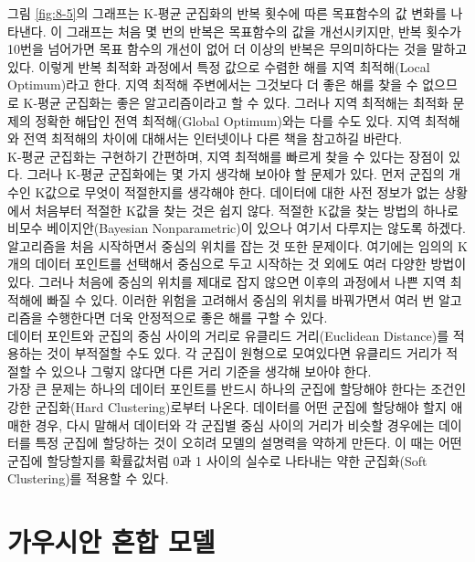 \documentclass[a4paper]{oblivoir}
\begin{document}
그림 \ref{fig:8-5}의 그래프는 K-평균 군집화의 반복 횟수에 따른 목표함수의 값 변화를 나타낸다. 이 그래프는 처음 몇 번의 반복은 목표함수의 값을 개선시키지만, 반복 횟수가 10번을 넘어가면 목표 함수의 개선이 없어 더 이상의 반복은 무의미하다는 것을 말하고 있다. 이렇게 반복 최적화 과정에서 특정 값으로 수렴한 해를 지역 최적해(Local Optimum)라고 한다. 지역 최적해 주변에서는 그것보다 더 좋은 해를 찾을 수 없으므로 K-평균 군집화는 좋은 알고리즘이라고 할 수 있다. 그러나 지역 최적해는 최적화 문제의 정확한 해답인 전역 최적해(Global Optimum)와는 다를 수도 있다. 지역 최적해와 전역 최적해의 차이에 대해서는 인터넷이나 다른 책을 참고하길 바란다. \\

K-평균 군집화는 구현하기 간편하며, 지역 최적해를 빠르게 찾을 수 있다는 장점이 있다. 그러나 K-평균 군집화에는 몇 가지 생각해 보아야 할 문제가 있다. 먼저 군집의 개수인 K값으로 무엇이 적절한지를 생각해야 한다. 데이터에 대한 사전 정보가 없는 상황에서 처음부터 적절한 K값을   찾는 것은 쉽지 않다. 적절한 K값을 찾는 방법의 하나로 비모수 베이지안(Bayesian Nonparametric)이 있으나 여기서 다루지는 않도록 하겠다. \\

알고리즘을 처음 시작하면서 중심의 위치를 잡는 것 또한 문제이다. 여기에는 임의의 K개의 데이터 포인트를 선택해서 중심으로 두고 시작하는 것 외에도 여러 다양한 방법이 있다. 그러나 처음에 중심의 위치를 제대로 잡지 않으면 이후의 과정에서 나쁜 지역 최적해에 빠질 수 있다. 이러한 위험을 고려해서 중심의 위치를 바꿔가면서 여러 번 알고리즘을 수행한다면 더욱 안정적으로 좋은 해를 구할 수 있다.  \\

데이터 포인트와 군집의 중심 사이의 거리로 유클리드 거리(Euclidean Distance)를 적용하는 것이 부적절할 수도 있다. 각 군집이 원형으로 모여있다면 유클리드 거리가 적절할 수 있으나 그렇지 않다면 다른 거리 기준을 생각해 보아야 한다. \\  

가장 큰 문제는 하나의 데이터 포인트를 반드시 하나의 군집에 할당해야 한다는 조건인 강한 군집화(Hard Clustering)로부터 나온다. 데이터를 어떤 군집에 할당해야 할지 애매한 경우, 다시 말해서 데이터와 각 군집별 중심 사이의 거리가 비슷할 경우에는 데이터를 특정 군집에 할당하는 것이 오히려 모델의 설명력을 약하게 만든다. 이 때는 어떤 군집에 할당할지를 확률값처럼 0과 1 사이의 실수로 나타내는 약한 군집화(Soft Clustering)를 적용할 수 있다.

\section{가우시안 혼합 모델}
\end{document}
